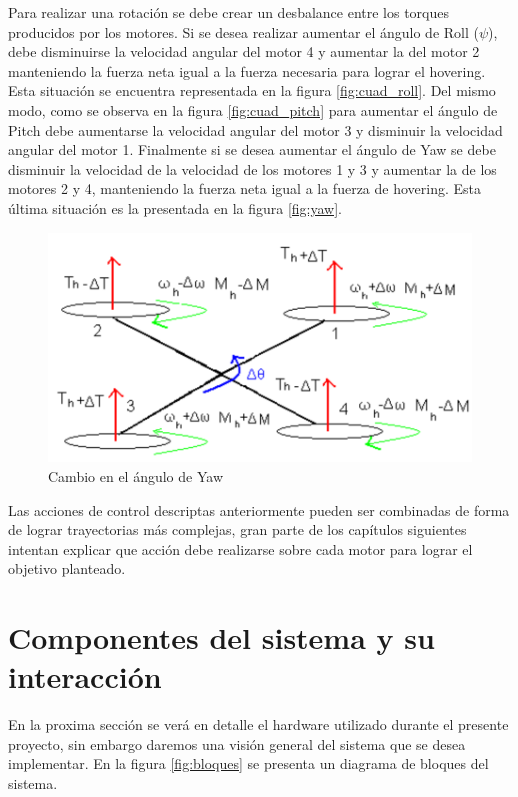 \documentclass[main]{subfiles}
\begin{document}
Para realizar una rotaci\'on se debe crear un desbalance entre los torques producidos por los motores. Si se desea realizar aumentar el \'angulo de Roll ($\psi$), debe disminuirse la velocidad  angular del motor 4 y aumentar la del motor 2 manteniendo la fuerza neta igual a la fuerza necesaria para lograr el hovering. Esta situaci\'on se encuentra representada en la figura \ref{fig:cuad_roll}. Del mismo modo, como se observa en la figura \ref{fig:cuad_pitch} para aumentar el \'angulo de Pitch debe aumentarse la velocidad angular del motor 3 y disminuir la velocidad angular del motor 1. Finalmente si se desea aumentar el \'angulo de Yaw se debe disminuir la velocidad de la velocidad de los motores 1 y 3 y aumentar la de los motores 2 y 4, manteniendo la fuerza neta igual a la fuerza de hovering. Esta \'ultima situaci\'on es la presentada en la figura \ref{fig:yaw}.



\begin{figure}[!h]
\centering
\includegraphics[scale=0.5]{./pics_general/quad_theta.pdf}
\caption{Cambio en el \'angulo de Yaw}
\label{fig:quad_theta}
\end{figure}
Las acciones de control descriptas anteriormente pueden ser combinadas de forma de lograr trayectorias m\'as complejas, gran parte de los cap\'itulos siguientes intentan explicar que acci\'on debe realizarse sobre cada motor para lograr el objetivo planteado.

\section{Componentes del sistema y su interacci\'on}

En la proxima secci\'on se ver\'a en detalle el hardware utilizado durante el presente proyecto, sin embargo daremos una visi\'on general del sistema que se desea implementar. En la figura \ref{fig:bloques} se presenta un diagrama de bloques del sistema.\\
\end{document}
